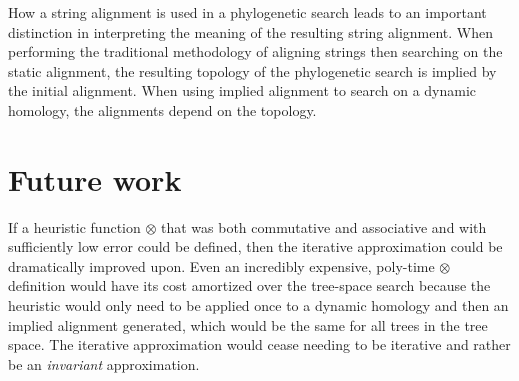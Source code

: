 \documentclass{bmcart}
\begin{document}
How a string alignment is used in a phylogenetic search leads to an important distinction in interpreting the meaning of the resulting string alignment.
When performing the traditional methodology of aligning strings then searching on the static alignment, the resulting topology of the phylogenetic search is implied by the initial alignment.
When using implied alignment to search on a dynamic homology, the alignments depend on the topology.


\section*{Future work}
If a heuristic function $\otimes$ that was both commutative and associative and with sufficiently low error could be defined, then the iterative approximation \citep{Wheeler2003a} could be dramatically improved upon. 
Even an incredibly expensive, poly-time $\otimes$ definition would have its cost amortized over the tree-space search because the heuristic would only need to be applied once to a dynamic homology and then an implied alignment generated, which would be the same for all trees in the tree space. 
The iterative approximation would cease needing to be iterative and rather be an \emph{invariant} approximation.
\end{document}
